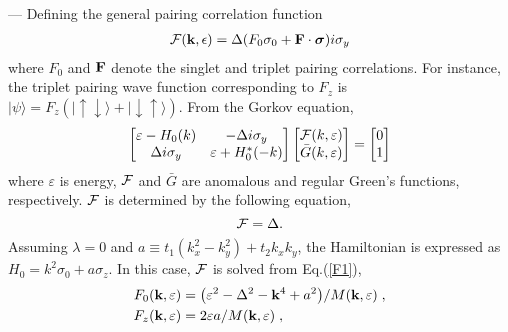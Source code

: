 \documentclass[aps, prb, twocolumn, amssymb, amsmath, showpacs, superscriptaddress]{revtex4-1}
\begin{document}
 --- Defining the general pairing correlation function\cite{Gorkov, Sigrist, GM-Tang}
\begin{eqnarray}
{\cal F}({\bf k}, \epsilon) = \Delta (F_0 \sigma_0 + {\bf F} \cdot {\boldsymbol{\sigma}})  i\sigma_y
\end{eqnarray}
where $F_0$ and ${\bf F}$ denote the singlet and triplet pairing correlations. For instance, the triplet pairing wave function corresponding to $F_z$ is $|\psi\rangle = F_z (|\uparrow \downarrow\rangle + |\downarrow\uparrow\rangle )$. From the Gorkov equation\cite{Gorkov, Sigrist, book1, GM-Tang},
\begin{equation}
\left[ \begin{matrix}
   \varepsilon -{{H}_{0}}( k ) & -\Delta i{{\sigma }_{y}}  \\
   \Delta i{{\sigma }_{y}} & \varepsilon +H_{0}^{*}( -k )  \\
\end{matrix} \right]\left[ \begin{matrix}
   {\cal F}( k,\varepsilon  )  \\
   \bar{G}( k,\varepsilon )  \\
\end{matrix} \right]=\left[ \begin{matrix}
   0  \\
   1  \\
\end{matrix} \right]
\end{equation}
where $\varepsilon$ is energy, ${\cal F}$ and ${\bar G}$ are anomalous and regular Green's functions, respectively.
${\cal F}$ is determined by the following equation,
\begin{equation}
[ {{\Delta }^{2}}i{{\sigma }_{y}}-i( \varepsilon +H_{0}^{*}( -k ) ){{\sigma }_{y}}( \varepsilon -{{H}_{0}}( k ) )]{\cal F}=\Delta.
\label{F1}
\end{equation}
Assuming $\lambda=0$ and $a \equiv t_1 (k_x^2 -k_y^2) + t_2 k_x k_y $, the Hamiltonian is expressed as $H_0 = k^2\sigma_0 + a\sigma_z$. In this case, ${\cal F}$ is solved from Eq.(\ref{F1}),
\begin{equation}
\begin{split}
{{F_{0}( \textbf{k},\varepsilon  )}}&={\left( {{\varepsilon }^{2}}-{{\Delta }^{2}}-{\bf k}^{4} +a^2 \right)}/{M( \textbf{k},\varepsilon  )}\;,\\
{{F_{z}( \textbf{k},\varepsilon  )}}&={2\varepsilon a}/{M( \textbf{k},\varepsilon  )}\;,
\end{split}
\end{equation}
\end{document}
